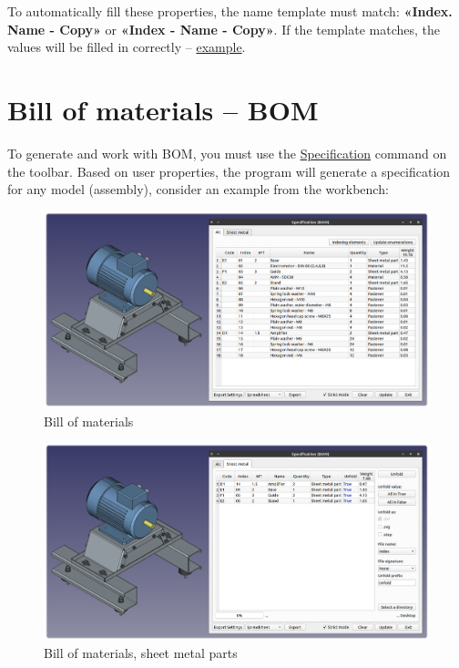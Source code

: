 \documentclass[a4paper,12pt]{article}
\begin{document}
To automatically fill these properties, the name template must match: \textbf{«Index. Name - Copy»} or \textbf{«Index - Name - Copy»}. If the template matches, the values ​​will be filled in correctly -- \hyperref[sec:properties]{example}.

\pagebreak




\section{Bill of materials -- BOM}

To generate and work with BOM, you must use the \hyperref[sec:4]{Specification} command on the toolbar. Based on user properties, the program will generate a specification for any model (assembly), consider an example from the workbench:

\begin{figure}[htp]
	\centering
	\includegraphics[width=1\textwidth]{img/specification_all.png}
	\caption{Bill of materials}
	\label{sec:specification_all}
\end{figure}

\begin{figure}[htp]
	\centering
	\includegraphics[width=1\textwidth]{img/specification_sm.png}
	\caption{Bill of materials, sheet metal parts}
	\label{sec:specification_sm}
\end{figure}
\end{document}
